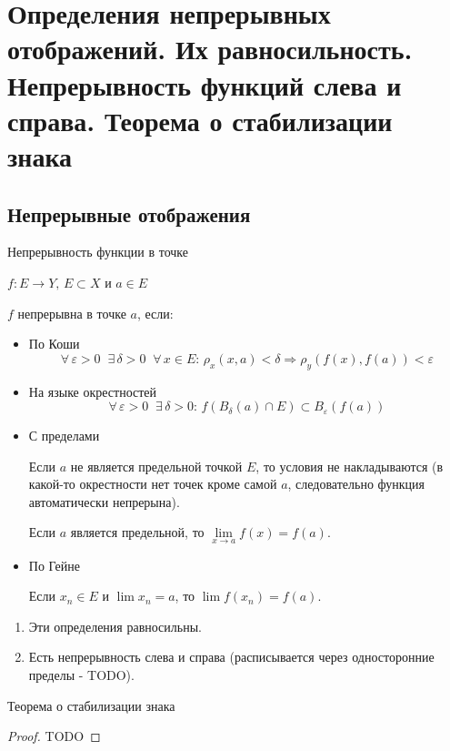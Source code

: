 \section{Определения непрерывных отображений. Их равносильность. Непрерывность функций слева и справа. Теорема о стабилизации знака}

\subsection{Непрерывные отображения}
\begin{conj}
    Непрерывность функции в точке 
\end{conj}
$f : E \to Y, \, E \subset X$ и $a \in E$

$f$ непрерывна в точке $a$, если:
\begin{itemize}
    \item По Коши
    \[ \forall \, \varepsilon > 0 \;\; \exists \, \delta > 0 \;\; \forall \, x \in E : \, \rho_x(x, a) < \delta \Rightarrow \rho_y(f(x), f(a)) < \varepsilon \]
    \item На языке окрестностей
    \[ \forall \, \varepsilon > 0 \;\; \exists \, \delta > 0 : \, f(B_{\delta}(a) \cap E) \subset B_{\varepsilon}(f(a)) \]
    \item С пределами
    
    Если $a$ не является предельной точкой $E$, то условия не накладываются (в какой-то окрестности нет точек кроме самой $a$, следовательно функция автоматически непрерына).

    Если $a$ является предельной, то $\lim\limits_{x \to a} f(x) = f(a)$.
    \item По Гейне
    
    Если $x_n \in E$ и $\lim x_n = a$, то $\lim f(x_n) = f(a)$.
\end{itemize}
\begin{notice}
    \begin{enumerate}
        \item Эти определения равносильны.
        \item Есть непрерывность слева и справа (расписывается через односторонние пределы - TODO).
    \end{enumerate}
\end{notice}
\begin{theorem-non}
    Теорема о стабилизации знака
\end{theorem-non}
\begin{proof}
    TODO
\end{proof}
